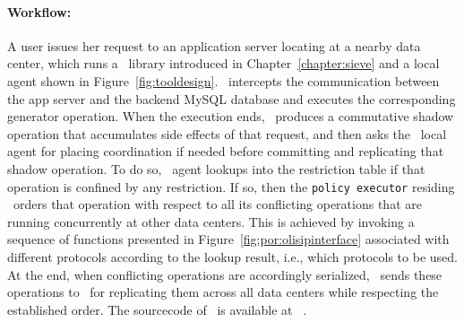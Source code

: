 \noindent\paragraph{Workflow:} A user issues her request to an application server locating at a nearby
data center, which runs a \tool\ library introduced in Chapter~\ref{chapter:sieve} and
a local agent shown in Figure~\ref{fig:tooldesign}. \tool\ intercepts the communication between
the app server and the backend MySQL database and executes the corresponding generator operation.
When the execution ends, \tool\ produces a commutative shadow operation that accumulates side effects
of that request, and then asks the \coordtool\ local agent for placing coordination if needed before committing and replicating
that shadow operation. To do so, \coordtool\ agent lookups into the restriction table
if that operation is confined by any restriction. If so, then the {\tt policy executor} residing
\coordtool\ orders that operation with respect to all its conflicting operations that are running concurrently
at other data centers. This is achieved by invoking a sequence of functions 
presented in Figure~\ref{fig:por:olisipinterface} associated with different protocols 
according to the lookup result, i.e., which protocols to be used. 
At the end, when conflicting operations are accordingly serialized, \tool\ sends these
operations to \gemini\ for replicating them across all data centers while respecting the established order. 
The sourcecode of \coordtool\ is available at ~\cite{olisipocode}.
